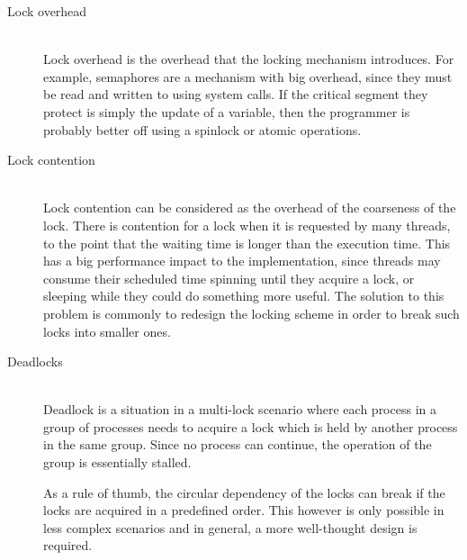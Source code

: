 \begin{description}
	\item[Lock overhead] \hfill \\
		Lock overhead is the overhead that the locking mechanism 
		introduces.  For example, semaphores are a mechanism with big 
		overhead, since they must be read and written to using system 
		calls. If the critical segment they protect is simply the 
		update of a variable, then the programmer is probably better 
		off using a spinlock or atomic operations.
	\item[Lock contention] \hfill \\
		Lock contention can be considered as the overhead of the 
		coarseness of the lock. There is contention for a lock when it 
		is requested by many threads, to the point that the waiting 
		time is longer than the execution time.
		This has a big performance impact to the implementation, since 
		threads may consume their scheduled time spinning until they 
		acquire a lock, or sleeping while they could do something more 
		useful.
		The solution to this problem is commonly to redesign the 
		locking scheme in order to break such locks into smaller ones.
	\item[Deadlocks] \hfill \\
		Deadlock is a situation in a multi-lock scenario where each 
		process in a group of processes needs to acquire a lock which 
		is held by another process in the same group. Since no process 
		can continue, the operation of the group is essentially 
		stalled.


		As a rule of thumb, the circular dependency of the locks can 
		break if the locks are acquired in a predefined order. This 
		however is only possible in less complex scenarios and in 
		general, a more well-thought design is required.
\end{description}
